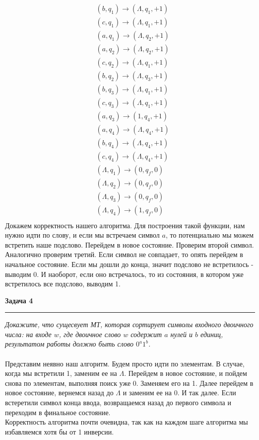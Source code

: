 \documentclass[a4paper,11pt]{article}
\begin{document}
\begin{align*}
	&(b, q_1) \rightarrow (\Lambda, q_1, +1) \\
	&(c, q_1) \rightarrow (\Lambda, q_1, +1) \\
	&(a, q_1) \rightarrow (\Lambda, q_2, +1) \\[10pt]
	&(a, q_2) \rightarrow (\Lambda, q_2, +1) \\
	&(c, q_2) \rightarrow (\Lambda, q_1, +1) \\
	&(b, q_2) \rightarrow (\Lambda, q_3, +1) \\[10pt]
	&(b, q_3) \rightarrow (\Lambda, q_1, +1) \\
	&(c, q_3) \rightarrow (\Lambda, q_1, +1) \\
	&(a, q_3) \rightarrow (1, q_4, +1) \\[10pt]
	&(a, q_4) \rightarrow (\Lambda, q_4, +1) \\	
	&(b, q_4) \rightarrow (\Lambda, q_4, +1) \\
	&(c, q_4) \rightarrow (\Lambda, q_4, +1) \\[10pt]
	&(\Lambda, q_1) \rightarrow (0, q_f, 0) \\
	&(\Lambda, q_2) \rightarrow (0, q_f, 0) \\
	&(\Lambda, q_3) \rightarrow (0, q_f, 0) \\
	&(\Lambda, q_4) \rightarrow (1, q_f, 0) \\
\end{align*}
Докажем корректность нашего алгоритма. Для построения такой функции, нам нужно идти по слову, и если мы встречаем символ $ a $, то потенциально мы можем встретить наше подслово. Перейдем в новое состояние. Проверим второй символ. Аналогично проверим третий. Если символ не совпадает, то опять перейдем в начальное состояние. Если мы дошли до конца, значит подслово не встретилось - выводим 0. И наоборот, если оно встречалось, то из состояния, в котором уже встретилось все подслово, выводим 1. 
\newpage






\textbf{\large Задача 4}
\medskip\hrule\medskip
\textit{Докажите, что сущесвует МТ, которая сортирует символы входного двоичного числа: на входе $ w $, где двоичное слово $ w $  содержит $ a $ нулей и $ b $ единиц, результатом работы должно быть слово $ 0^{a}1^{b} $.} \\ \\

Представим неявно наш алгоритм. Будем просто идти по элементам. В случае, когда мы встретили 1, заменим ее на $ \Lambda  $. Перейдем в новое состояние, и пойдем снова по элементам, выполняя поиск уже 0. Заменяем его на 1. Далее перейдем в новое состояние, вернемся назад до $ \Lambda $ и заменим ее на 0. И так далее. Если встеретили символ конца ввода, возвращаемся назад до первого символа и переходим в финальное состояние.  \\[2pt]
Корректность алгоритма почти очевидна, так как на каждом шаге алгоритма мы избавляемся хотя бы от 1 инверсии.  \\ \\ \\
\end{document}
